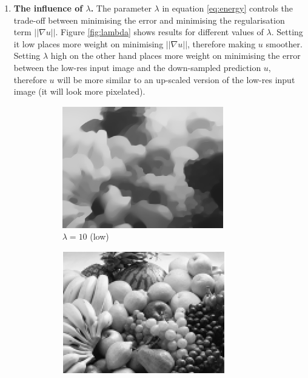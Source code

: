 \documentclass{paper}
\begin{document}
\begin{enumerate}
\item \textbf{The influence of $\lambda$.} 
The parameter $\lambda$ in equation \ref{eq:energy} controls the trade-off between minimising the error and minimising the regularisation term $||\nabla u||$. Figure \ref{fig:lambda} shows results for different values of $\lambda$. Setting it low places more weight on minimising $||\nabla u||$, therefore making $u$ smoother. Setting $\lambda$ high on the other hand places more weight on minimising the error between the low-res input image and the down-sampled prediction $u$, therefore $u$ will be more similar to an up-scaled version of the low-res input image (it will look more pixelated).
\begin{figure}[]
\begin{center}
	\begin{subfigure}[b]{0.49\textwidth}
                \includegraphics[width=\textwidth]{lambda10}
                \caption{$\lambda=10$ (low)}
        \end{subfigure}
        	\begin{subfigure}[b]{0.49\textwidth}
                \includegraphics[width=\textwidth]{lambda1000000}

\end{subfigure}
\end{center}
\end{figure}
\end{enumerate}
\end{document}
